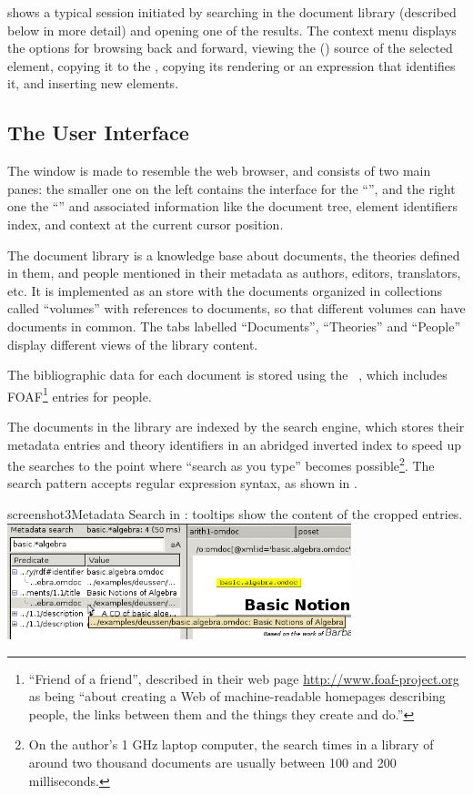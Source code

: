 {} shows a typical session initiated by searching in the
document library (described below in more detail)
and opening one of the results.
The context menu displays the options for
browsing back and forward,
viewing the {\xml} ({\omdoc}) source of the selected element,
copying it to the {},
copying its {\mathml} rendering
or an {\xpath} expression that identifies it,
and inserting new elements.

\subsection{The User Interface}

The window is made to resemble the web browser,
and consists of two main panes:
the smaller one on the left contains the interface for the ``{}'',
and the right one the ``{}'' and associated information
like the document tree,
element identifiers index,
and context at the current cursor position.

The document library is a knowledge base about documents,
the theories defined in them,
and people mentioned in their metadata as authors, editors, translators, etc.
It is implemented as an {\rdf} store with the documents organized in
collections called ``volumes'' with references to documents,
so that different volumes can have documents in common.
The tabs labelled ``Documents'', ``Theories'' and ``People'' display
different views of the library content.

The bibliographic data for each document
is stored using the {}~\cite{Lennox04},
which includes
FOAF\footnote{``Friend of a friend'', described in their web page
  \url{http://www.foaf-project.org} as being
``about creating a Web of machine-readable homepages describing people,
  the links between them and the things they create and do.''}
entries for people.

The documents in the library are indexed by the search engine,
which stores their metadata entries and theory identifiers
in an abridged inverted index to speed up the searches
to the point where ``search as you type'' becomes possible\footnote{On the
  author's 1 GHz laptop computer, the search times in a library of around two thousand
  documents are usually between 100 and 200 milliseconds.}.
The search pattern accepts regular expression syntax, as shown in {}.

\begin{myfig}{screenshot3}{Metadata Search in {\sentido}: tooltips show the content of the cropped entries.}
  \includegraphics[width=10cm]{projects/sentido/sentido_metadata_search_tooltip_detail}
\end{myfig}

